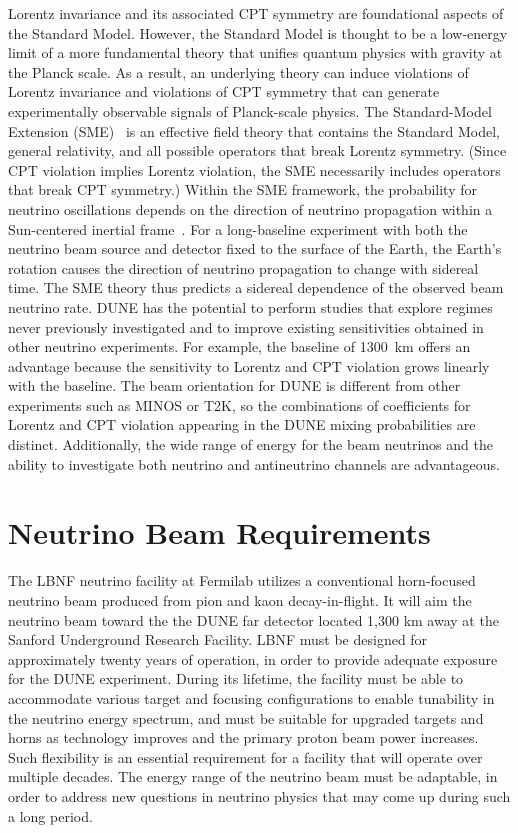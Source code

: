 Lorentz invariance and its associated CPT symmetry
are foundational aspects of the Standard Model. However, the Standard Model is thought to be a low-energy limit of a more fundamental theory that unifies quantum physics with gravity at the Planck
scale. As a result, an underlying theory can induce violations of Lorentz invariance and
violations of CPT symmetry that can generate experimentally observable signals of Planck-scale physics.
The Standard-Model Extension (SME)~\cite{Colladay:1996iz,Colladay:1998fq,Kostelecky:2003fs} is an effective field theory that contains the Standard Model, general relativity, and all possible operators that break Lorentz symmetry. (Since CPT violation implies Lorentz violation, the SME necessarily includes operators that break CPT symmetry.)  Within the SME framework, the probability for neutrino oscillations depends on the direction of neutrino propagation within a Sun-centered inertial frame~\cite{Kostelecky:2003cr,Kostelecky:2011gq}.  For a long-baseline experiment with both the neutrino beam source and detector fixed to the surface of the Earth, the Earth's rotation causes the direction of neutrino propagation to change with sidereal time.  The SME theory thus predicts a sidereal dependence of the observed beam neutrino rate.  DUNE has the potential to perform studies that explore regimes never previously investigated and to improve existing
sensitivities obtained in other neutrino experiments.
For example, the baseline of 1300~km offers an advantage because the sensitivity to 
Lorentz and CPT violation grows linearly with the baseline.   The
beam orientation for DUNE is different from other experiments such as MINOS or T2K, so
the combinations of coefficients for Lorentz and CPT violation appearing in the DUNE mixing probabilities are
distinct. Additionally, the wide range of energy for the beam neutrinos and the ability to investigate both neutrino and antineutrino channels are advantageous.

\section{Neutrino Beam Requirements}
\label{sec:physics-lbnosc-beam-req}
The LBNF neutrino facility at Fermilab utilizes a conventional
horn-focused neutrino beam produced from pion and kaon decay-in-flight. It will
aim the neutrino beam toward the 
the DUNE far detector located 1,300 km away at the Sanford Underground
Research Facility. LBNF must be designed for approximately twenty years of operation, in order to provide adequate exposure for the DUNE experiment. During its lifetime, the facility must be able to accommodate various target and focusing configurations to enable tunability 
in the neutrino energy spectrum, and must be suitable for upgraded targets and horns as technology improves and the primary proton beam power increases. Such
flexibility is an essential requirement for a facility that will operate over multiple decades. The energy range of the neutrino beam must be adaptable, in order to address new questions in neutrino physics that may come up during such a long period.

